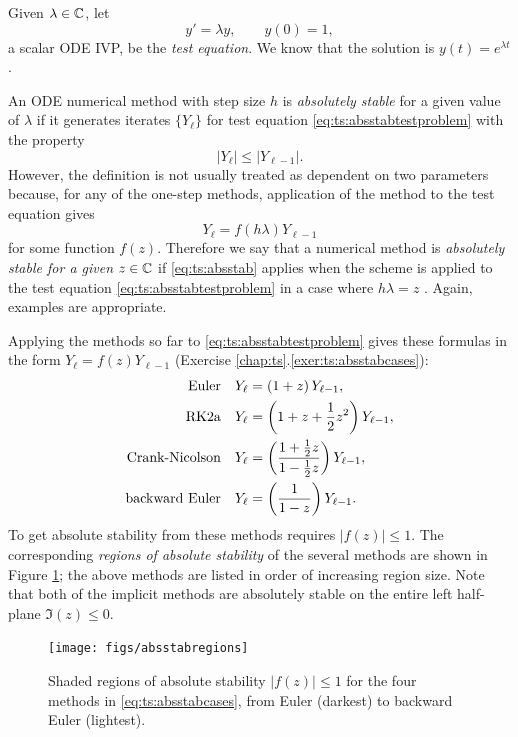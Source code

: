 Given $\lambda \in \mathbb{C}$, let
\begin{equation}
y' = \lambda y, \qquad y(0)=1, \label{eq:ts:absstabtestproblem}
\end{equation}
a scalar ODE IVP, be the \emph{test equation}.  We know that the solution is $y(t) = e^{\lambda t}$.

An ODE numerical method with step size $h$ is \emph{absolutely stable} for a given value of $\lambda$ if it generates iterates $\{Y_\ell\}$ for test equation \eqref{eq:ts:absstabtestproblem} with the property
\begin{equation}
|Y_\ell| \le |Y_{\ell-1}|. \label{eq:ts:absstab}
\end{equation}
However, the definition is not usually treated as dependent on two parameters because, for any of the one-step methods, application of the method to the test equation gives
    $$Y_\ell = f(h\lambda) Y_{\ell-1}$$
for some function $f(z)$.  Therefore we say that a numerical method is \emph{absolutely stable for a given} $z\in\mathbb{C}$ if \eqref{eq:ts:absstab} applies when the scheme is applied to the test equation \eqref{eq:ts:absstabtestproblem} in a case where $h\lambda=z$ \citep{AscherPetzold1998}.  Again, examples are appropriate.

Applying the methods so far to \eqref{eq:ts:absstabtestproblem} gives these formulas in the form $Y_\ell = f(z) Y_{\ell-1}$ (Exercise \ref{chap:ts}.\ref{exer:ts:absstabcases}):
\begin{align}
\text{Euler}              && Y_\ell &= \left(1+z\right) Y_{\ell-1}, \label{eq:ts:absstabcases} \\
\text{RK$2$a}            && Y_\ell &= \left(1+z + \frac{1}{2} z^2\right) Y_{\ell-1}, \notag \\
\text{Crank-Nicolson}     && Y_\ell &= \left(\frac{1+\frac{1}{2} z}{1-\frac{1}{2}z}\right) Y_{\ell-1}, \notag \\
\text{backward Euler}     && Y_\ell &= \left(\frac{1}{1-z}\right) Y_{\ell-1}. \notag
\end{align}
To get absolute stability from these methods requires $|f(z)|\le 1$.  The corresponding \emph{regions of absolute stability} of the several methods are shown in Figure \ref{fig:ts:absstabregions}; the above methods are listed in order of increasing region size.  Note that both of the implicit methods are absolutely stable on the entire left half-plane $\Im(z)\le 0$.

\begin{figure}
\texttt{[image: figs/absstabregions]}
\caption{Shaded regions of absolute stability $|f(z)|\le 1$ for the four methods in \eqref{eq:ts:absstabcases}, from Euler (darkest) to backward Euler (lightest).}
\label{fig:ts:absstabregions}
\end{figure}

